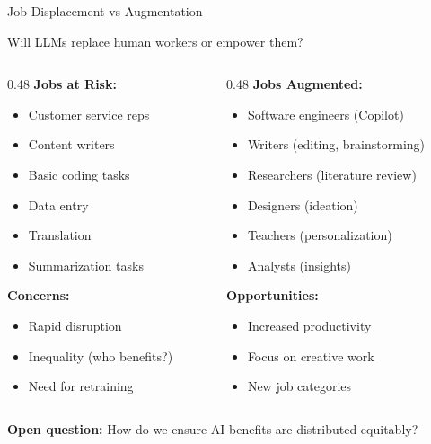 \documentclass[aspectratio=169]{beamer}
\begin{document}
\begin{frame}[shrink=10]{Job Displacement vs Augmentation 💼}
\begin{discussionbox}
Will LLMs replace human workers or empower them?
\end{discussionbox}

\vspace{0.5em}

\begin{columns}[T]
\begin{column}{0.48\textwidth}
\textbf{Jobs at Risk:}
\begin{itemize}\setlength{\itemsep}{0pt}
    \item Customer service reps
    \item Content writers
    \item Basic coding tasks
    \item Data entry
    \item Translation
    \item Summarization tasks
\end{itemize}

\vspace{0.5em}

\textbf{Concerns:}
\begin{itemize}\setlength{\itemsep}{0pt}
    \item Rapid disruption
    \item Inequality (who benefits?)
    \item Need for retraining
\end{itemize}
\end{column}

\begin{column}{0.48\textwidth}
\textbf{Jobs Augmented:}
\begin{itemize}\setlength{\itemsep}{0pt}
    \item Software engineers (Copilot)
    \item Writers (editing, brainstorming)
    \item Researchers (literature review)
    \item Designers (ideation)
    \item Teachers (personalization)
    \item Analysts (insights)
\end{itemize}

\vspace{0.5em}

\textbf{Opportunities:}
\begin{itemize}\setlength{\itemsep}{0pt}
    \item Increased productivity
    \item Focus on creative work
    \item New job categories
\end{itemize}
\end{column}
\end{columns}

\vspace{0.5em}

\textbf{Open question:} How do we ensure AI benefits are distributed equitably?
\end{frame}
\end{document}

